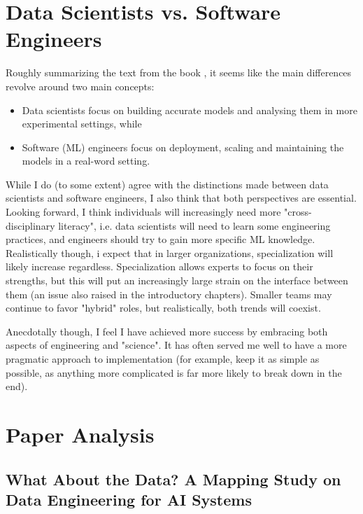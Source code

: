 \documentclass[11pt,compsoc,a4paper]{IEEEtran}
\begin{document}
\section{Data Scientists vs. Software Engineers}

    Roughly summarizing the text from the book \cite{kastner2025mlprod}, it seems like the main differences revolve around two main concepts:
    \begin{itemize}
        \item Data scientists focus on building accurate models and analysing them in more experimental settings, while
        \item Software (ML) engineers focus on deployment, scaling and maintaining the models in a real-word setting.
    \end{itemize}

    \noindent While I do (to some extent) agree with the distinctions made between data scientists and software engineers, I also think that both perspectives are essential. Looking forward, I think individuals will increasingly need more "cross-disciplinary literacy", i.e. data scientists will need to learn some engineering practices, and engineers should try to gain more specific ML knowledge. Realistically though, i expect that in larger organizations, specialization will likely increase regardless. Specialization allows experts to focus on their strengths, but this will put an increasingly large strain on the interface between them (an issue also raised in the introductory chapters). Smaller teams may continue to favor "hybrid" roles, but realistically, both trends will coexist.

    Anecdotally though, I feel I have achieved more success by embracing both aspects of engineering and "science". It has often served me well to have a more pragmatic approach to implementation (for example, keep it as simple as possible, as anything more complicated is far more likely to break down in the end).

\newpage
\section{Paper Analysis}
    \vspace{0.5cm}
   
    \subsection*{What About the Data? A Mapping Study on Data Engineering for AI Systems}
\end{document}
